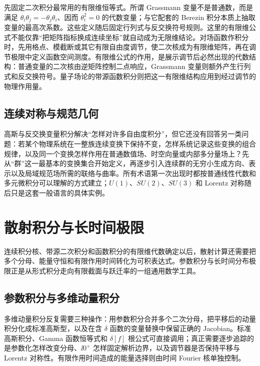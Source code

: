 先固定二次积分最常用的有限维恒等式。所谓 Grassmann 变量不是普通数，而是满足 $\theta_i\theta_j=-\theta_j\theta_i$、因而 $\theta_i^2=0$ 的代数变量；与它配套的 Berezin 积分本质上抽取变量的最高次系数。这些定义随后固定行列式与反交换符号规则。这里的有限维公式不能仅靠“把矩阵指标换成连续坐标”就自动成为无限维结论。对场函数作积分时，先用格点、模截断或其它有限自由度调节，使二次核成为有限维矩阵，再在调节极限中定义函数空间测度。有限维公式的作用，是展示调节后必然出现的代数结构：普通变量的二次核由逆矩阵控制二点响应，Grassmann 变量则额外产生行列式和反交换符号。量子场论的带源函数积分则把这一有限维结构应用到经过调节的物理作用量。





\subsection{连续对称与规范几何}
高斯与反交换变量积分解决“怎样对许多自由度积分”，但它还没有回答另一类问题：若某个物理系统在一整族连续变换下保持不变，怎样系统记录这些变换的组合规律，以及同一个变换怎样作用在普通数值场、时空向量或内部多分量场上？先从“群”这一最基本的变换集合开始定义，再逐步引入连续群的无穷小生成方向、表示以及局域规范场所需的联络与曲率。所有术语第一次出现时都按普通线性代数和多元微积分可以理解的方式建立；$U(1)$、$SU(2)$、$SU(3)$ 和 Lorentz 对称随后只是这套一般语言的具体实例。







\section{散射积分与长时间极限}

连续积分核、带源二次积分和函数积分的有限维代数确定以后，散射计算还需要把多个分母、能量守恒和有限作用时间转化为可积表达式。参数积分与长时间分布极限正是从形式积分走向有限截面与跃迁率的一组通用数学工具。

\subsection{参数积分与多维动量积分}
多维动量积分反复需要三种操作：用参数积分合并多个二次分母，把平移后的动量积分化成标准高斯型，以及在含 $\delta$ 函数的变量替换中保留正确的 Jacobian。标准高斯积分、Gamma 函数恒等式和 $\delta[f]$ 根公式可直接调用；真正需要逐步追踪的是参数化怎样改变分母、$\ii0^+$ 怎样固定解析边界，以及调节器是否保持平移与 Lorentz 对称性。有限作用时间造成的能量选择则由时间 Fourier 核单独控制。

